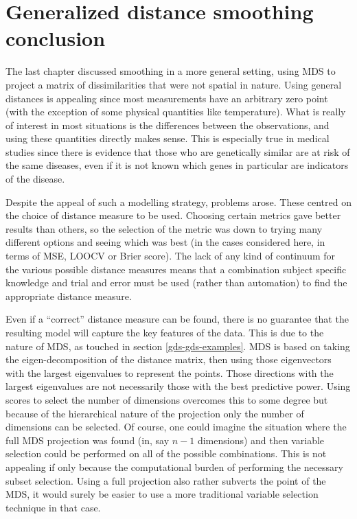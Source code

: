 \section{Generalized distance smoothing conclusion}
\label{fasend-gds-conc}

The last chapter discussed smoothing in a more general setting, using MDS to project a matrix of dissimilarities that were not spatial in nature. Using general distances is appealing since most measurements have an arbitrary zero point (with the exception of some physical quantities like temperature). What is really of interest in most situations is the differences between the observations, and using these quantities directly makes sense. This is especially true in medical studies since there is evidence that those who are genetically similar are at risk of the same diseases, even if it is not known which genes in particular are indicators of the disease.

Despite the appeal of such a modelling strategy, problems arose. These centred on the choice of distance measure to be used. Choosing certain metrics gave better results than others, so the selection of the metric was down to trying many different options and seeing which was best (in the cases considered here, in terms of MSE, LOOCV or Brier score). The lack of any kind of continuum for the various possible distance measures means that a combination subject specific knowledge and trial and error must be used (rather than automation) to find the appropriate distance measure.

Even if a ``correct'' distance measure can be found, there is no guarantee that the resulting model will capture the key features of the data. This is due to the nature of MDS, as touched in section \ref{gds-gds-examples}. MDS is based on taking the eigen-decomposition of the distance matrix, then using those eigenvectors with the largest eigenvalues to represent the points. Those directions with the largest eigenvalues are not necessarily those with the best predictive power. Using scores to select the number of dimensions overcomes this to some degree but because of the hierarchical nature of the projection only the number of dimensions can be selected. Of course, one could imagine the situation where the full MDS projection was found (in, say $n-1$ dimensions) and then variable selection could be performed on all of the possible combinations. This is not appealing if only because the computational burden of performing the necessary subset selection. Using a full projection also rather subverts the point of the MDS, it would surely be easier to use a more traditional variable selection technique in that case.

